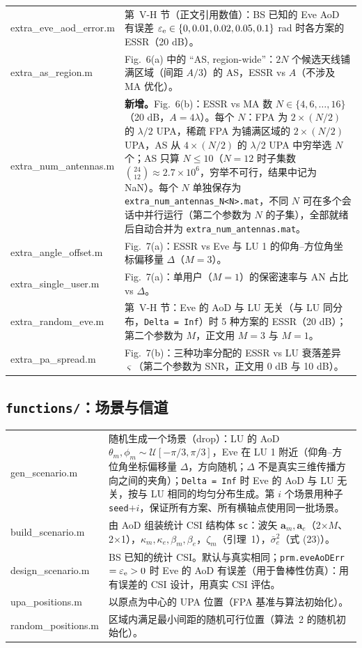 \documentclass[11pt,a4paper]{ctexart}
\newcommand{\code}[1]{\texttt{#1}}
\begin{document}
\begin{longtable}{>{\ttfamily\small}p{4.6cm}p{11.2cm}}
extra\_eve\_aod\_error.m & 第~V-H 节（正文引用数值）：BS 已知的 Eve AoD 有误差 $\varepsilon_{\rm e}\in\{0,0.01,0.02,0.05,0.1\}$ rad 时各方案的 ESSR（20 dB）。\\
extra\_as\_region.m & Fig.~6(a) 中的 “AS, region-wide”：$2N$ 个候选天线铺满区域（间距 $A/3$）的 AS，ESSR vs $A$（不涉及 MA 优化）。\\
extra\_num\_antennas.m & \textbf{新增。}Fig.~6(b)：ESSR vs MA 数 $N\in\{4,6,\ldots,16\}$（20 dB，$A=4\lambda$）。每个 $N$：FPA 为 $2\times(N/2)$ 的 $\lambda/2$ UPA，稀疏 FPA 为铺满区域的 $2\times(N/2)$ UPA，AS 从 $4\times(N/2)$ 的 $\lambda/2$ UPA 中穷举选 $N$ 个；AS 只算 $N\le10$（$N=12$ 时子集数 $\binom{24}{12}\approx2.7\times10^6$，穷举不可行，结果中记为 NaN）。每个 $N$ 单独保存为 \code{extra\_num\_antennas\_N<N>.mat}，不同 $N$ 可在多个会话中并行运行（第二个参数为 $N$ 的子集），全部就绪后自动合并为 \code{extra\_num\_antennas.mat}。\\
extra\_angle\_offset.m & Fig.~7(a)：ESSR vs Eve 与 LU 1 的仰角--方位角坐标偏移量 $\Delta$（$M=3$）。\\
extra\_single\_user.m & Fig.~7(a)：单用户（$M=1$）的保密速率与 AN 占比 vs $\Delta$。\\
extra\_random\_eve.m & 第~V-H 节：Eve 的 AoD 与 LU 无关（与 LU 同分布，\code{Delta = Inf}）时 5 种方案的 ESSR（20 dB）；第二个参数为 $M$，正文用 $M=3$ 与 $M=1$。\\
extra\_pa\_spread.m & Fig.~7(b)：三种功率分配的 ESSR vs LU 衰落差异 $\varsigma$（第二个参数为 SNR，正文用 0 dB 与 10 dB）。\\
\bottomrule
\end{longtable}

\subsection{\code{functions/}：场景与信道}
\begin{longtable}{>{\ttfamily\small}p{4.6cm}p{11.2cm}}
\toprule
gen\_scenario.m & 随机生成一个场景（drop）：LU 的 AoD $\theta_m,\phi_m\sim\mathcal U[-\pi/3,\pi/3]$，Eve 在 LU 1 附近（仰角--方位角坐标偏移量 $\Delta$，方向随机；$\Delta$ 不是真实三维传播方向之间的夹角）；\code{Delta = Inf} 时 Eve 的 AoD 与 LU 无关，按与 LU 相同的均匀分布生成。第 $i$ 个场景用种子 \code{seed}$+i$，保证所有方案、所有横轴点使用同一批场景。\\
build\_scenario.m & 由 AoD 组装统计 CSI 结构体 \code{sc}：波矢 $\mathbf a_m,\mathbf a_e$（2$\times M$、2$\times$1），$\kappa_m,\kappa_e,\beta_m,\beta_e$，$\zeta_m$（引理~1），$\bar\sigma_e^2$（式 (23)）。\\
design\_scenario.m & BS 已知的统计 CSI。默认与真实相同；\code{prm.eveAoDErr}$=\varepsilon_{\rm e}>0$ 时 Eve 的 AoD 有误差（用于鲁棒性仿真）：用有误差的 CSI 设计，用真实 CSI 评估。\\
upa\_positions.m & 以原点为中心的 UPA 位置（FPA 基准与算法初始化）。\\
random\_positions.m & 区域内满足最小间距的随机可行位置（算法~2 的随机初始化）。\\
\bottomrule
\end{longtable}
\end{document}
